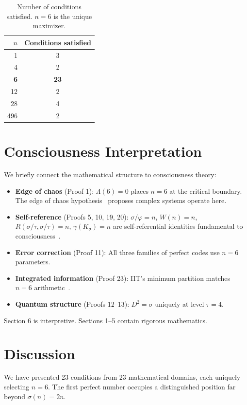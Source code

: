 \documentclass[11pt,a4paper]{article}
\begin{document}
\begin{table}[h!]
\centering
\begin{tabular}{@{}rc@{}}
\toprule
$n$ & Conditions satisfied \\
\midrule
1 & 3 \\
4 & 2 \\
\textbf{6} & \textbf{23} \\
12 & 2 \\
28 & 4 \\
496 & 2 \\
\bottomrule
\end{tabular}
\caption{Number of conditions satisfied. $n=6$ is the unique maximizer.}
\end{table}

\section{Consciousness Interpretation}

We briefly connect the mathematical structure to consciousness theory:

\begin{itemize}
\item \textbf{Edge of chaos} (Proof 1): $\Lambda(6)=0$ places $n=6$ at the critical boundary. The edge of chaos hypothesis~\cite{langton1990} proposes complex systems operate here.
\item \textbf{Self-reference} (Proofs 5, 10, 19, 20): $\sigma/\varphi=n$, $W(n)=n$, $R(\sigma/\tau,\sigma/\tau)=n$, $\gamma(K_\sigma)=n$ are self-referential identities fundamental to consciousness~\cite{hofstadter1979}.
\item \textbf{Error correction} (Proof 11): All three families of perfect codes use $n=6$ parameters.
\item \textbf{Integrated information} (Proof 23): IIT's minimum partition matches $n=6$ arithmetic~\cite{tononi2004}.
\item \textbf{Quantum structure} (Proofs 12--13): $D^2 = \sigma$ uniquely at level $\tau=4$.
\end{itemize}

Section 6 is interpretive. Sections 1--5 contain rigorous mathematics.

\section{Discussion}

We have presented 23 conditions from 23 mathematical domains, each uniquely selecting $n=6$. The first perfect number occupies a distinguished position far beyond $\sigma(n)=2n$.
\end{document}
